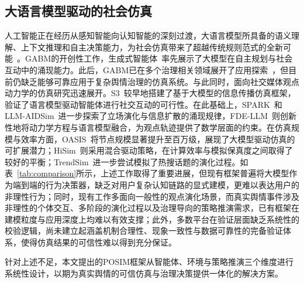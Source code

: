 \documentclass[a4paper,fleqn]{cas-dc}
\begin{document}
\subsection{大语言模型驱动的社会仿真}

人工智能正在经历从感知智能向认知智能的深刻过渡，大语言模型所具备的语义理解、上下文推理和自主决策能力，为社会仿真带来了超越传统规则范式的全新可能~\citep{wang_survey_2024}。GABM的开创性工作，生成式智能体~\citep{park_generative_2023}率先展示了大模型在自主规划与社会互动中的涌现能力。此后，GABM已在多个治理相关领域展开了应用探索~\citep{QI2026130753,repec:jas:jasssj:2025-107-3}，但目前仍缺乏能够可靠应用于复杂舆情治理的仿真系统。与此同时，面向社交媒体观点动力学的仿真研究迅速展开。S3~\citep{gao_s3_2023}较早地搭建了基于大模型的信息传播仿真框架，验证了语言模型驱动智能体进行社交互动的可行性。在此基础上，SPARK~\citep{zhang_spark_2025}和LLM-AIDSim~\citep{zhang_llm-aidsim_2025,hu_llm-enhanced_2024}进一步探索了立场演化与信息扩散的涌现规律，FDE-LLM~\citep{yao_social_2025}则创新性地将动力学方程与语言模型融合，为观点轨迹提供了数学层面的约束。在仿真规模与效率方面，OASIS~\citep{yang_oasis_2025}将节点规模显著提升至百万级，展现了大模型驱动仿真的可扩展潜力；HiSim~\citep{mou_unveiling_2024}则采用混合驱动策略，在计算效率与模拟保真度之间取得了较好的平衡；TrendSim~\citep{zhang_trendsim_2025}进一步尝试模拟了热搜话题的演化过程。如表~\ref{tab:comparison}所示，上述工作取得了重要进展，但现有框架普遍将大模型作为端到端的行为决策器，缺乏对用户复杂认知链路的显式建模，更难以表达用户的非理性行为；同时，现有工作多面向一般性的观点演化场景，而真实舆情事件涉及非理性的个体交互、多阶段的演化过程以及治理导向的策略推演需求，已有框架在建模粒度与应用深度上均难以有效支撑；此外，多数平台在验证层面缺乏系统性的校验逻辑，尚未建立起涵盖机制合理性、现象一致性与数据可靠性的完备验证体系，使得仿真结果的可信性难以得到充分保证。

针对上述不足，本文提出的POSIM框架从智能体、环境与策略推演三个维度进行系统性设计，以期为真实舆情的可信仿真与治理决策提供一体化的解决方案。
\end{document}
